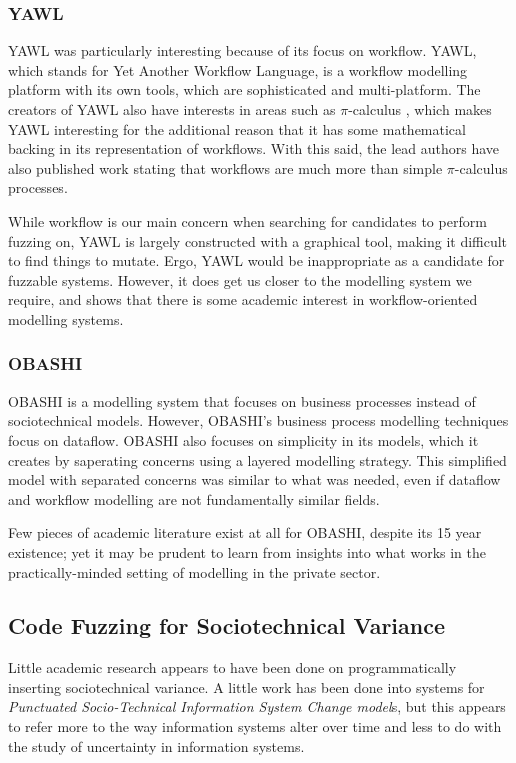 \documentclass[11pt, twocolumn]{article}
\newcommand{\picalc}{\(\pi\)-calculus }
\begin{document}
\subsubsection{YAWL} %
YAWL was particularly interesting because of its focus on workflow. YAWL, which stands for Yet Another Workflow Language\cite{TerHofstede2010}, is a workflow modelling platform with its own tools, which are sophisticated and multi-platform. The creators of YAWL also have interests in areas such as \picalc\cite{Aalst2004}, which makes YAWL interesting for the additional reason that it has some mathematical backing in its representation of workflows. With this said, the lead authors have also published work stating that workflows are much more than simple \picalc processes\cite{Aalst2004}. \par

While workflow is our main concern when searching for candidates to perform fuzzing on, YAWL is largely constructed with a graphical tool, making it difficult to find things to mutate. Ergo, YAWL would be inappropriate as a candidate for fuzzable systems. However, it does get us closer to the modelling system we require, and shows that there is some academic interest in workflow-oriented modelling systems. \par

\subsubsection{OBASHI}
OBASHI\cite{ObashiMethodology} is a modelling system that focuses on business processes instead of sociotechnical models. However, OBASHI's business process modelling techniques focus on dataflow. OBASHI also focuses on simplicity in its models, which it creates by saperating concerns using a layered modelling strategy. This simplified model with separated concerns was similar to what was needed, even if dataflow and workflow modelling are not fundamentally similar fields. \par 

Few pieces of academic literature exist at all for OBASHI, despite its 15 year existence; yet it may be prudent to learn from insights into what works in the practically-minded setting of modelling in the private sector. \par

\subsection{Code Fuzzing for Sociotechnical Variance}
Little academic research appears to have been done on programmatically inserting sociotechnical variance. A little work has been done into systems for \emph{Punctuated Socio-Technical Information System Change model}s\cite{Lyytinen2008}, but this appears to refer more to the way information systems alter over time and less to do with the study of uncertainty in information systems. \par
\end{document}
